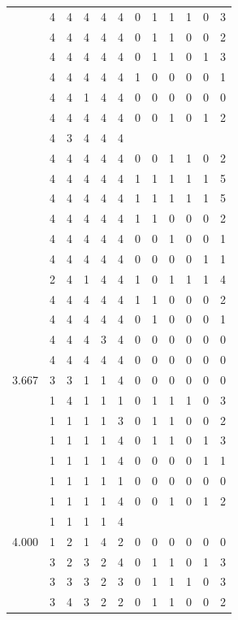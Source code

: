\documentclass[]{msu-thesis}
\theoremstyle{definition}
\theoremstyle{definition}
\theoremstyle{definition}
\theoremstyle{remark}
\begin{document}
\begin{table}
{\begin{tabular}[t]{rrrrrrrrrrrr}
 & 4 & 4 & 4 & 4 & 4 & 0 & 1 & 1 & 1 & 0 & 3\\
 & 4 & 4 & 4 & 4 & 4 & 0 & 1 & 1 & 0 & 0 & 2\\
 & 4 & 4 & 4 & 4 & 4 & 0 & 1 & 1 & 0 & 1 & 3\\
 & 4 & 4 & 4 & 4 & 4 & 1 & 0 & 0 & 0 & 0 & 1\\
 & 4 & 4 & 1 & 4 & 4 & 0 & 0 & 0 & 0 & 0 & 0\\
 & 4 & 4 & 4 & 4 & 4 & 0 & 0 & 1 & 0 & 1 & 2\\
 & 4 & 3 & 4 & 4 & 4 &  &  &  &  &  & \\
 & 4 & 4 & 4 & 4 & 4 & 0 & 0 & 1 & 1 & 0 & 2\\
 & 4 & 4 & 4 & 4 & 4 & 1 & 1 & 1 & 1 & 1 & 5\\
 & 4 & 4 & 4 & 4 & 4 & 1 & 1 & 1 & 1 & 1 & 5\\
 & 4 & 4 & 4 & 4 & 4 & 1 & 1 & 0 & 0 & 0 & 2\\
 & 4 & 4 & 4 & 4 & 4 & 0 & 0 & 1 & 0 & 0 & 1\\
 & 4 & 4 & 4 & 4 & 4 & 0 & 0 & 0 & 0 & 1 & 1\\
 & 2 & 4 & 1 & 4 & 4 & 1 & 0 & 1 & 1 & 1 & 4\\
 & 4 & 4 & 4 & 4 & 4 & 1 & 1 & 0 & 0 & 0 & 2\\
 & 4 & 4 & 4 & 4 & 4 & 0 & 1 & 0 & 0 & 0 & 1\\
 & 4 & 4 & 4 & 3 & 4 & 0 & 0 & 0 & 0 & 0 & 0\\
 & 4 & 4 & 4 & 4 & 4 & 0 & 0 & 0 & 0 & 0 & 0\\
3.667 & 3 & 3 & 1 & 1 & 4 & 0 & 0 & 0 & 0 & 0 & 0\\
 & 1 & 4 & 1 & 1 & 1 & 0 & 1 & 1 & 1 & 0 & 3\\
 & 1 & 1 & 1 & 1 & 3 & 0 & 1 & 1 & 0 & 0 & 2\\
 & 1 & 1 & 1 & 1 & 4 & 0 & 1 & 1 & 0 & 1 & 3\\
 & 1 & 1 & 1 & 1 & 4 & 0 & 0 & 0 & 0 & 1 & 1\\
 & 1 & 1 & 1 & 1 & 1 & 0 & 0 & 0 & 0 & 0 & 0\\
 & 1 & 1 & 1 & 1 & 4 & 0 & 0 & 1 & 0 & 1 & 2\\
 & 1 & 1 & 1 & 1 & 4 &  &  &  &  &  & \\
4.000 & 1 & 2 & 1 & 4 & 2 & 0 & 0 & 0 & 0 & 0 & 0\\
 & 3 & 2 & 3 & 2 & 4 & 0 & 1 & 1 & 0 & 1 & 3\\
 & 3 & 3 & 3 & 2 & 3 & 0 & 1 & 1 & 1 & 0 & 3\\
 & 3 & 4 & 3 & 2 & 2 & 0 & 1 & 1 & 0 & 0 & 2\\

\end{tabular}}
\end{table}
\end{document}
